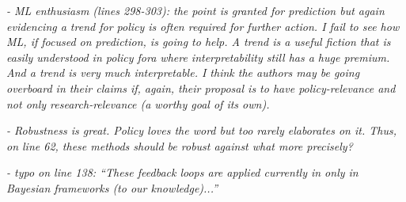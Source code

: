 \documentclass[11pt,letter]{article}
\begin{document}
\begin{mybox}
\emph{- ML enthusiasm (lines 298-303): the point is granted for prediction but again evidencing a
trend for policy is often required for further action. I fail to see how ML, if focused on
prediction, is going to help. A trend is a useful fiction that is easily understood in policy
fora where interpretability still has a huge premium. And a trend is very much
interpretable. I think the authors may be going overboard in their claims if, again, their
proposal is to have policy-relevance and not only research-relevance (a worthy goal of its
own).}  
\end{mybox}

\begin{mybox}
\emph{- Robustness is great. Policy loves the word but too rarely elaborates on it. Thus, on line 62,
these methods should be robust against what more precisely?}  
\end{mybox}

\begin{mybox}
\emph{- typo on line 138: “These feedback loops are applied currently in only in Bayesian
frameworks (to our knowledge)...”}
\end{mybox}
\end{document}
